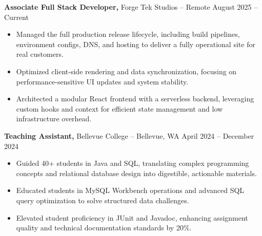 \documentclass[11pt]{article}       %
\begin{document}
\textbf{Associate Full Stack Developer,} {Forge Tek Studios} -- Remote \hfill August 2025 -- Current 
\vspace{-9pt}
\begin{itemize}
  \item Managed the full production release lifecycle, including build pipelines, environment configs, DNS, and hosting to deliver a fully operational site for real customers.
  \item Optimized client-side rendering and data synchronization, focusing on performance-sensitive UI updates and system stability.
  \item Architected a modular React frontend with a serverless backend, leveraging custom hooks and context for efficient state management and low infrastructure overhead.
\end{itemize}

\textbf{Teaching Assistant,} {Bellevue College} -- Bellevue, WA \hfill April 2024 -- December 2024 \\
\vspace{-9pt}
\begin{itemize}
  \item Guided 40+ students in Java and SQL, translating complex programming concepts and relational database design into digestible, actionable materials.
  \item Educated students in MySQL Workbench operations and advanced SQL query optimization to solve structured data challenges.
  \item Elevated student proficiency in JUnit and Javadoc, enhancing assignment quality and technical documentation standards by 20\%.
\end{itemize}

\end{document}
